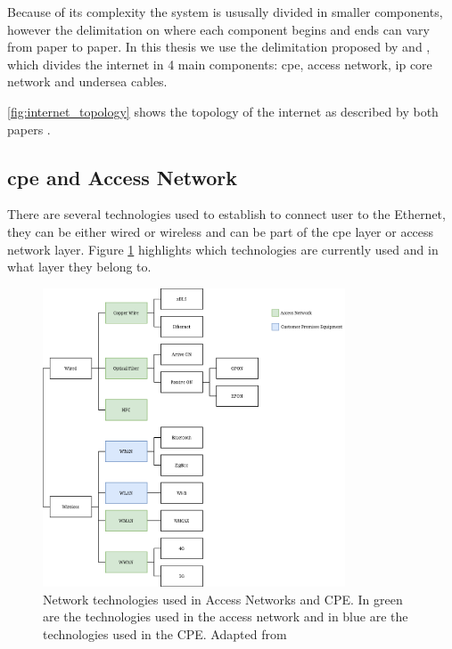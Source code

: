 Because of its complexity the system is ususally divided in smaller components, however the delimitation on where each component begins and ends can vary from paper to paper. In this thesis we use the delimitation proposed by \citet{Coroama2015} and \citet{Schien2015}, which divides the internet in 4 main components: \ac{cpe}, access network, \ac{ip} core network and undersea cables.

\ref{fig:internet_topology} shows the topology of the internet as described by both papers \cite{Coroama2015} \cite{Schien2015}. 

\subsection{\acl{cpe} and Access Network}

There are several technologies used to establish to connect user to the Ethernet, they can be either wired or wireless and can be part of the \ac{cpe} layer or access network layer. Figure \ref{figure:network_technologies} highlights which technologies are currently used and in what layer they belong to.

\begin{figure}[h]
    \centering
    \includegraphics[width=0.8\textwidth]{figs/network_technologies.png}
    \caption[Network technologies used in Access Networks and CPE]{Network technologies used in Access Networks and CPE. In green are the technologies used in the access network and in blue are the technologies used in the CPE. Adapted from \citet{forum:huwawei}}
    \label{figure:network_technologies}
\end{figure}

